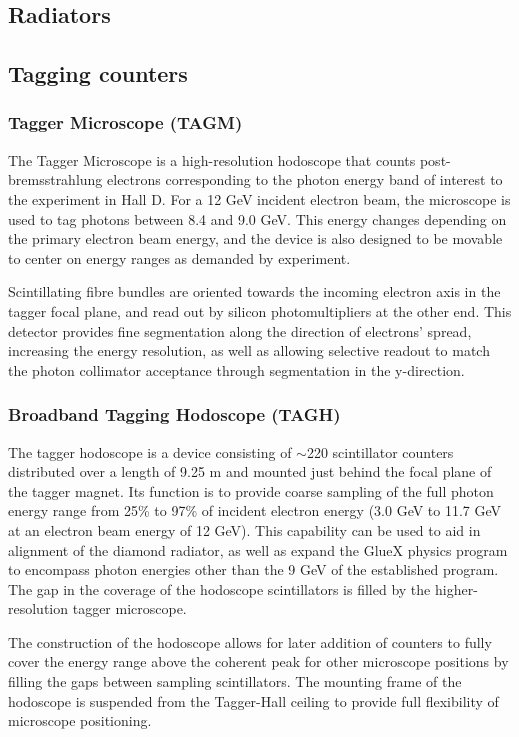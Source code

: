 \subsection{Radiators \label{sec:radiators}}


\subsection{Tagging counters \label{sec:tag}}


\subsubsection{Tagger Microscope (TAGM)}\label{sec:TAGM}
The Tagger Microscope is a high-resolution hodoscope that counts post-bremsstrahlung electrons corresponding to the photon energy band of interest to the experiment in Hall D.
For a 12 GeV incident electron beam, the microscope is used to tag photons between 8.4 and 9.0 GeV.
This energy changes depending on the primary electron beam energy, and the device is also designed to be movable to center on energy ranges as demanded by experiment.

Scintillating fibre bundles are oriented towards the incoming electron axis in the tagger focal plane, and read out by silicon photomultipliers at the other end.
This detector provides fine segmentation along the direction of electrons' spread, increasing the energy resolution, as well as allowing selective readout to match the photon collimator acceptance through segmentation in the y-direction.

\subsubsection{Broadband Tagging Hodoscope (TAGH)}\label{sec:TAGHIntro}
The tagger hodoscope is a device consisting of $\sim$220 scintillator counters distributed over a length of 9.25 m and mounted just behind the focal plane of the tagger magnet.
Its function is to provide coarse sampling of the full photon energy range from 25\% to 97\% of incident electron energy (3.0 GeV to 11.7 GeV at an electron beam energy of 12 GeV).
This capability can be used to aid in alignment of the diamond radiator, as well as expand the GlueX physics program to encompass photon energies other than the 9 GeV of the established program.
The gap in the coverage of the hodoscope scintillators is filled by the higher-resolution tagger microscope.

The construction of the hodoscope allows for later addition of counters to fully cover the energy range above the coherent peak for other microscope positions by filling the gaps between sampling scintillators. The mounting frame of the hodoscope is suspended from the Tagger-Hall ceiling to provide full flexibility of microscope positioning.


